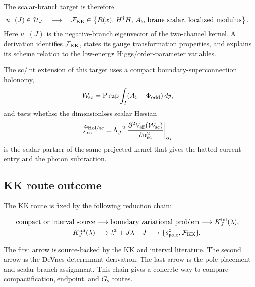 \begin{widetext}
The scalar-branch target is therefore
\begin{equation}
  u_-(J)\in\mathcal H_J
  \quad\longmapsto\quad
  \mathcal F_{\rm KK}
  \in
  \left\{
  R(x),\,
  H^\dagger H,\,
  A_5,\,
  \hbox{brane scalar},\,
  \hbox{localized modulus}
  \right\}.
  \label{eq:kk-negative-branch-map}
\end{equation}
Here \(u_-(J)\) is the negative-branch eigenvector of the two-channel kernel.  A derivation identifies \(\mathcal F_{\rm KK}\), states its gauge transformation properties, and explains its scheme relation to the low-energy Higgs/order-parameter variables.
\end{widetext}

The sc/int extension of this target uses a compact boundary-superconnection
holonomy,
\begin{equation}
  \mathcal W_{\rm sc}
  =
  {\rm P}\exp\int_I (A_5+\Phi_{\rm odd})\,dy,
  \label{eq:kk-superconnection-holonomy}
\end{equation}
and tests whether the dimensionless scalar Hessian
\begin{equation}
  \widehat{\mathcal F}_{\rm sc}^{\rm Hol/sc}
  =
  \Lambda_J^{-2}
  \left.
  \frac{\partial^2V_{\rm eff}(\mathcal W_{\rm sc})}
       {\partial\alpha_{\rm sc}^2}
  \right|_{\alpha_\star}
  \label{eq:kk-superconnection-holonomy-hessian}
\end{equation}
is the scalar partner of the same projected kernel that gives the hatted
current entry and the photon subtraction.

\subsection{KK route outcome}
\label{sec:kk-completion-criterion}

The KK route is fixed by the following reduction chain:
\begin{widetext}
\begin{equation}
\begin{aligned}
  \text{compact or interval source}
  &\longrightarrow
  \text{boundary variational problem}
  \longrightarrow
  K_J^{\rm int}(\lambda),
  \\
  K_J^{\rm int}(\lambda)
  &\longrightarrow
  \lambda^2+J\lambda-J
  \longrightarrow
  \{s^2_{\rm pole},\mathcal F_{\rm KK}\}.
\end{aligned}
\label{eq:kk-completion-chain}
\end{equation}
\end{widetext}
The first arrow is source-backed by the KK and interval literature.  The second arrow is the DeVries determinant derivation.  The last arrow is the pole-placement and scalar-branch assignment.  This chain gives a concrete way to compare compactification, endpoint, and \(G_2\) routes.
